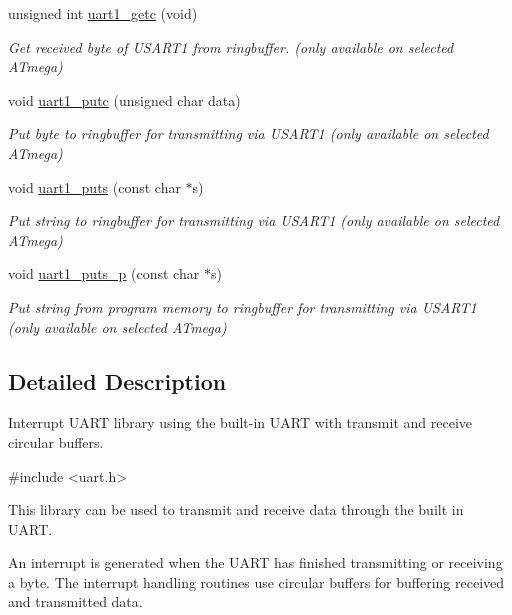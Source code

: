 \begin{DoxyCompactItemize}
unsigned int \hyperlink{group__pfleury__uart_gaeb1405c641e5bc9b7224018f5e8d90de}{uart1\+\_\+getc} (void)
\begin{DoxyCompactList}\small\item\em Get received byte of U\+S\+A\+R\+T1 from ringbuffer. (only available on selected A\+Tmega) \end{DoxyCompactList}\item 
void \hyperlink{group__pfleury__uart_gab465f689d197fadfbacc374fc9411154}{uart1\+\_\+putc} (unsigned char data)
\begin{DoxyCompactList}\small\item\em Put byte to ringbuffer for transmitting via U\+S\+A\+R\+T1 (only available on selected A\+Tmega) \end{DoxyCompactList}\item 
void \hyperlink{group__pfleury__uart_ga5568f8f3913b218fd4d0346af78831b2}{uart1\+\_\+puts} (const char $\ast$s)
\begin{DoxyCompactList}\small\item\em Put string to ringbuffer for transmitting via U\+S\+A\+R\+T1 (only available on selected A\+Tmega) \end{DoxyCompactList}\item 
void \hyperlink{group__pfleury__uart_ga1e8074d0a2d5922601c5db2f9777ba79}{uart1\+\_\+puts\+\_\+p} (const char $\ast$s)
\begin{DoxyCompactList}\small\item\em Put string from program memory to ringbuffer for transmitting via U\+S\+A\+R\+T1 (only available on selected A\+Tmega) \end{DoxyCompactList}\end{DoxyCompactItemize}


\subsection{Detailed Description}
Interrupt U\+A\+RT library using the built-\/in U\+A\+RT with transmit and receive circular buffers. 


\begin{DoxyCode}
\textcolor{preprocessor}{#include <uart.h>} 
\end{DoxyCode}


This library can be used to transmit and receive data through the built in U\+A\+RT.

An interrupt is generated when the U\+A\+RT has finished transmitting or receiving a byte. The interrupt handling routines use circular buffers for buffering received and transmitted data.


